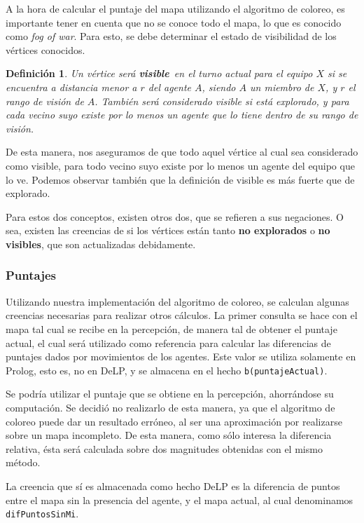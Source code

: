 \documentclass[oneside]{book}
\newtheorem{definicion}{Definición}
\begin{document}
A la hora de calcular el puntaje del mapa utilizando el algoritmo de coloreo,
es importante tener en cuenta que no se conoce todo el mapa, lo que es conocido 
como \textit{fog of war}. Para esto, se debe determinar el estado de visibilidad
de los vértices conocidos. 

\begin{definicion}
Un vértice será \textbf{visible}\ en el turno actual para el equipo $X$ si se 
encuentra a distancia 
menor a $r$ del agente $A$, siendo $A$ un miembro de $X$, y $r$ el rango de visión 
de $A$. También será considerado visible si está explorado, y para cada vecino suyo 
existe por lo menos un agente que lo tiene dentro de su rango de visión.
\end{definicion}

De esta manera, nos aseguramos de que todo aquel vértice al cual sea considerado 
como visible, para todo vecino suyo existe por lo menos un agente del equipo 
que lo ve. Podemos observar también que la definición de visible es más fuerte que
de explorado.

Para estos dos conceptos, existen otros dos, que se refieren a sus negaciones. O 
sea, existen las creencias de si los vértices están tanto \textbf{no explorados}
o \textbf{no visibles}, que son actualizadas debidamente.


\subsubsection{Puntajes}

Utilizando nuestra implementación del algoritmo de coloreo, se calculan algunas
creencias necesarias para realizar otros cálculos. La primer consulta se hace con
el mapa tal cual se recibe en la percepción, de manera tal de obtener el puntaje
actual, el cual será utilizado como referencia para calcular las diferencias de
puntajes dados por movimientos de los agentes. Este valor se utiliza solamente
en Prolog, esto es, no en DeLP, y se almacena en el hecho \texttt{b(puntajeActual)}.

Se podría utilizar el puntaje que se obtiene en la percepción, ahorrándose
su computación. Se decidió no realizarlo de esta manera, ya que el algoritmo de 
coloreo puede dar un resultado erróneo, al ser una aproximación por realizarse
sobre un mapa incompleto. De esta manera, como sólo interesa la diferencia 
relativa, ésta será calculada sobre dos magnitudes obtenidas con el mismo 
método.

La creencia que sí es almacenada como hecho DeLP es la diferencia de puntos entre
el mapa sin la presencia del agente, y el mapa actual, al cual denominamos
\texttt{difPuntosSinMi}.
\end{document}
